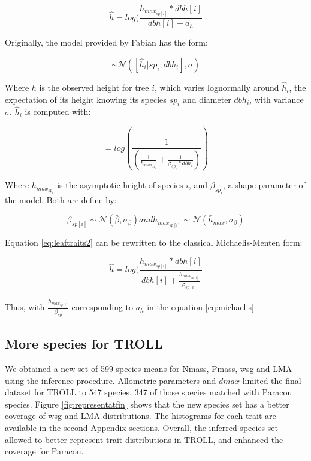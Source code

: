 \documentclass[12pt,]{article}
\theoremstyle{definition}
\theoremstyle{definition}
\theoremstyle{definition}
\theoremstyle{remark}
\begin{document}
\begin{equation}
  \hat h = log(\frac{h_{max_{sp[i]}}*dbh[i]}{dbh[i]+a_h}
  \label{eq:michaelis}
\end{equation}

Originally, the model provided by Fabian has the form:

\begin{equation}
  [log(h_i) |sp_i; dbh_i] \sim \mathcal{N}([\hat h_i | sp_i; dbh_i], \sigma)
  \label{eq:michaelis2}
\end{equation}

Where \(h\) is the observed height for tree \(i\), which varies
lognormally around \(\hat h_i\), the expectation of its height knowing
its species \(sp_i\) and diameter \(dbh_i\), with variance \(\sigma\).
\(\hat h_i\) is computed with:

\begin{equation}
  [\hat h_i | sp_i; dbh_i] = log(\frac{1}{(\frac{1}{h_{max_{sp_i}}}+\frac{1}{\beta_{sp_i}*dbh_i})})
  \label{eq:leaftraits1}
\end{equation}

Where \(h_{max_{sp_i}}\) is the asymptotic height of species \(i\), and
\(\beta_{sp_i}\), a shape parameter of the model. Both are define by:

\begin{equation}
  \beta_{sp[i]}  \sim \mathcal{N}(\bar \beta, \sigma_{\beta}) and  h_{max_{sp[i]}}  \sim \mathcal{N}(\bar h_{max}, \sigma_{\beta}) 
  \label{eq:michaelis2}
\end{equation}

Equation \eqref{eq:leaftraits2} can be rewritten to the classical
Michaelis-Menten form:

\begin{equation}
  \hat h = log(\frac{h_{max_{sp[i]}}*dbh[i]}{dbh[i]+\frac{h_{max_{sp[i]}}}{\beta_{sp[i]}}}
  \label{eq:leaftraits2}
\end{equation}

Thus, with \(\frac{h_{max_{sp[i]}}}{\beta_{sp}}\) corresponding to
\(a_h\) in the equation \eqref{eq:michaelis}

\subsection{More species for TROLL}\label{more-species-for-troll}

We obtained a new set of 599 species means for Nmass, Pmass, wsg and LMA
using the inference procedure. Allometric parameters and \(dmax\)
limited the final dataset for TROLL to 547 species. 347 of those species
matched with Paracou species. Figure \ref{fig:representatfin} shows that
the new species set has a better coverage of wsg and LMA distributions.
The histograms for each trait are available in the second Appendix
sections. Overall, the inferred species set allowed to better represent
trait distributions in TROLL, and enhanced the coverage for Paracou.
\end{document}
